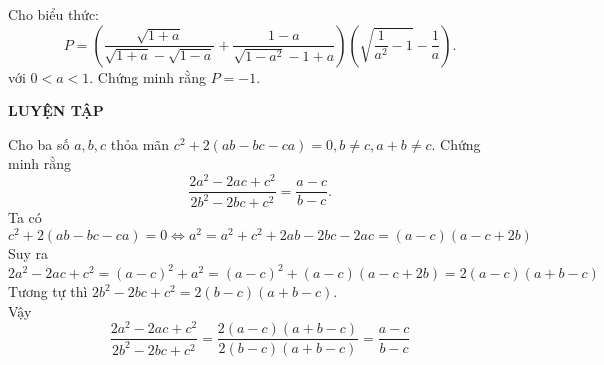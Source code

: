 \begin{vd}%
	Cho biểu thức:
	$$P=\left(\dfrac{\sqrt{1+a}}{\sqrt{1+a}-\sqrt{1-a}}+\dfrac{1-a}{\sqrt{1-a^2}-1+a}\right)\left(\sqrt{\dfrac{1}{a^2}-1}-\dfrac{1}{a}\right).$$ với $0<a<1$. Chứng minh rằng $P=-1$.
\end{vd}



\begin{center}
	\textbf{LUYỆN TẬP}
\end{center}
\begin{bt}%
	\hfill
	
	Cho ba số $a,b,c$ thỏa mãn $c^2+2(ab-bc-ca)=0, b\ne c, a+b \ne c$. Chứng minh rằng 
	$$\dfrac{2a^2-2ac+c^2}{2b^2-2bc+c^2}=\dfrac{a-c}{b-c}.$$
	\loigiai
	{Ta có 
		$$c^2+2(ab-bc-ca)=0 \Leftrightarrow a^2=a^2+c^2+2ab-2bc-2ac=(a-c)(a-c+2b)$$
		Suy ra 
		$$2a^2-2ac+c^2=(a-c)^2+a^2=(a-c)^2+(a-c)(a-c+2b)=2(a-c)(a+b-c)$$
		Tương tự thì $2b^2-2bc+c^2=2(b-c)(a+b-c)$.\\
		Vậy 
		$$\dfrac{2a^2-2ac+c^2}{2b^2-2bc+c^2}=\dfrac{2(a-c)(a+b-c)}{2(b-c)(a+b-c)}=\dfrac{a-c}{b-c}$$
	}
\end{bt}




